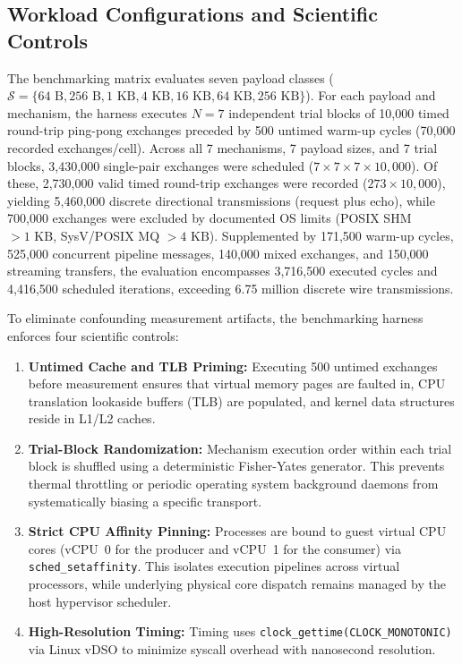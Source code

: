 \subsection{Workload Configurations and Scientific Controls}
The benchmarking matrix evaluates seven payload classes ($\mathcal{S} = \{64\text{ B}, 256\text{ B}, 1\text{ KB}, 4\text{ KB}, 16\text{ KB}, 64\text{ KB}, 256\text{ KB}\}$). For each payload and mechanism, the harness executes $N = 7$ independent trial blocks of 10,000 timed round-trip ping-pong exchanges preceded by 500 untimed warm-up cycles (70,000 recorded exchanges/cell). Across all 7 mechanisms, 7 payload sizes, and 7 trial blocks, 3,430,000 single-pair exchanges were scheduled ($7 \times 7 \times 7 \times 10,000$). Of these, 2,730,000 valid timed round-trip exchanges were recorded ($273 \times 10,000$), yielding 5,460,000 discrete directional transmissions (request plus echo), while 700,000 exchanges were excluded by documented OS limits (POSIX SHM $>1\text{ KB}$, SysV/POSIX MQ $>4\text{ KB}$). Supplemented by 171,500 warm-up cycles, 525,000 concurrent pipeline messages, 140,000 mixed exchanges, and 150,000 streaming transfers, the evaluation encompasses 3,716,500 executed cycles and 4,416,500 scheduled iterations, exceeding 6.75 million discrete wire transmissions.

To eliminate confounding measurement artifacts, the benchmarking harness enforces four scientific controls:
\begin{enumerate}[leftmargin=*,noitemsep,topsep=1.5pt]
    \item \textbf{Untimed Cache and TLB Priming:} Executing 500 untimed exchanges before measurement ensures that virtual memory pages are faulted in, CPU translation lookaside buffers (TLB) are populated, and kernel data structures reside in L1/L2 caches.
    \item \textbf{Trial-Block Randomization:} Mechanism execution order within each trial block is shuffled using a deterministic Fisher-Yates generator. This prevents thermal throttling or periodic operating system background daemons from systematically biasing a specific transport.
    \item \textbf{Strict CPU Affinity Pinning:} Processes are bound to guest virtual CPU cores (vCPU~0 for the producer and vCPU~1 for the consumer) via \texttt{sched\_setaffinity}. This isolates execution pipelines across virtual processors, while underlying physical core dispatch remains managed by the host hypervisor scheduler.
    \item \textbf{High-Resolution Timing:} Timing uses \texttt{clock\_gettime(CLOCK\_MONOTONIC)} via Linux vDSO to minimize syscall overhead with nanosecond resolution.
\end{enumerate}

